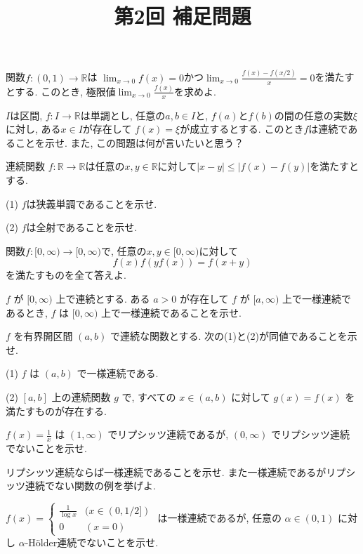 \documentclass[dvipdfmx,11pt]{jsarticle}
\title{第2回 補足問題}
\author{}
\date{}
\newcommand{\dsp}{\displaystyle}
\newcommand{\prob}{\vspace{2mm}\pro}
\theoremstyle{definition}
\numberwithin{equation}{section}
\begin{document}
\maketitle

\vspace{-1.5cm}

\prob 関数$f : (0, 1)\rightarrow \mathbb{R}$は $\dsp\lim_{x\rightarrow 0}f(x)=0$かつ$\dsp\lim_{x\rightarrow 0}\frac{f(x)-f(x/2)}{x}=0$を満たすとする. このとき, 極限値$\dsp\lim_{x\rightarrow 0}\frac{f(x)}{x}$を求めよ.

\prob $I$は区間, $f:I\rightarrow\mathbb{R}$は単調とし, 任意の$a, b\in I$と, $f(a)$と$f(b)$の間の任意の実数$\xi$に対し, ある$x\in I$が存在して $f(x)=\xi$が成立するとする. このとき$f$は連続であることを示せ. また, この問題は何が言いたいと思う？

\prob\label{aa} 連続関数 $f : \mathbb{R}\rightarrow \mathbb{R}$は任意の$x, y\in\mathbb{R}$に対して$|x-y|\leqslant|f(x)-f(y)|$を満たすとする.

(1) $f$は狭義単調であることを示せ.

(2) $f$は全射であることを示せ.

\prob 関数$f:[0, \infty)\rightarrow[0, \infty)$で, 任意の$x, y\in[0,\infty)$に対して
\[f(x)f(yf(x))=f(x+y)\]
を満たすものを全て答えよ.

\prob $f$ が $[0,\infty)$ 上で連続とする. ある $a>0$ が存在して $f$ が $[a,\infty)$ 上で一様連続であるとき, $f$ は $[0,\infty)$ 上で一様連続であることを示せ.

\prob $f$ を有界開区間 $(a , b)$ で連続な関数とする. 次の(1)と(2)が同値であることを示せ.

(1) $f$ は $(a , b)$ で一様連続である.

(2) $[a , b]$ 上の連続関数 $g$ で, すべての $x\in (a , b)$ に対して $g(x)=f(x)$ を満たすものが存在する.

\prob $\dsp f(x)=\frac{1}{x}$ は $(1 , \infty)$ でリプシッツ連続であるが, $(0 , \infty)$ でリプシッツ連続でないことを示せ.

\prob リプシッツ連続ならば一様連続であることを示せ. また一様連続であるがリプシッツ連続でない関数の例を挙げよ.

\prob $f(x)=
\begin{cases}
	\dsp\frac{1}{\log x} & (x\in (0,1/2]) \\ 0 & (x=0)
\end{cases}$ 
は一様連続であるが, 任意の $\alpha \in (0,1)$ に対し $\alpha$-H\"{o}lder連続でないことを示せ.
\end{document}
